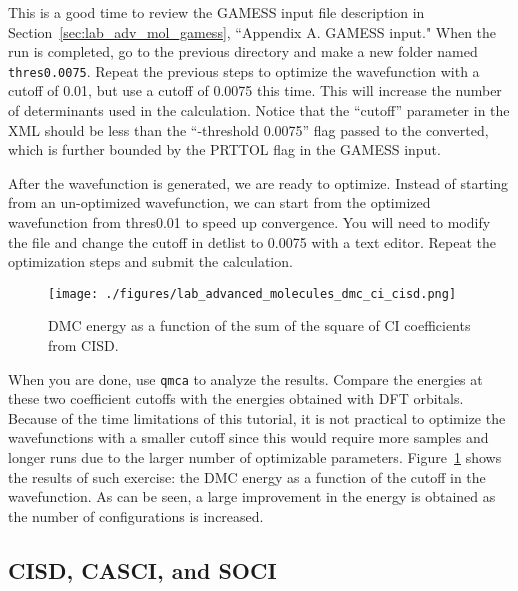 This is a good time to review the GAMESS input file description in Section~\ref{sec:lab_adv_mol_gamess}, ``Appendix A. GAMESS input."
When the run is completed, go to the previous directory and make a new folder named
\texttt{thres0.0075}. Repeat the previous steps to optimize the wavefunction with a cutoff of 0.01, but use a cutoff of 0.0075 this time. This will increase the number of determinants used in the calculation. Notice that the ``cutoff'' parameter in the XML should be less than the ``-threshold 0.0075'' flag passed to the converted, which is further bounded by the PRTTOL flag in the GAMESS input.

After the wavefunction is generated, we are ready to optimize. Instead of starting from an un-optimized wavefunction, we can start from the optimized wavefunction from thres0.01 to speed up convergence. You will need to modify the file and change the cutoff in detlist to 0.0075 with a text editor. Repeat the optimization steps and submit the calculation.

\begin{figure}
\begin{center}
\texttt{[image: ./figures/lab\_advanced\_molecules\_dmc\_ci\_cisd.png]}
\end{center}
\caption{DMC energy as a function of the sum of the square of CI coefficients from CISD.}
\label{fig:lam_dmc_ci_cisd}
\end{figure}

When you are done, use \texttt{qmca} to analyze the results. Compare the energies at these two
coefficient cutoffs with the energies obtained with DFT orbitals. Because of the time limitations of this tutorial, it is not practical to optimize the wavefunctions with a smaller cutoff since this would require more samples and longer runs due to the larger number of optimizable parameters. Figure~\ref{fig:lam_dmc_ci_cisd} shows the results of such exercise: the DMC energy as a function of the cutoff in the wavefunction. As can be seen, a large improvement in the energy is obtained as the number of configurations is increased.



\subsection{CISD, CASCI, and SOCI}

